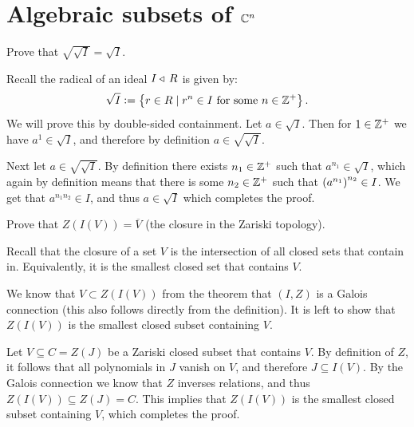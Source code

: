 \documentclass[11pt, a4paper]{article}
\begin{document}
\tableofcontents
\newpage

\section{Algebraic subsets of \texorpdfstring{$\mathbb{C}^n$}{C}}

\begin{exercise}
  Prove that $\sqrt{\sqrt{I}} = \sqrt{I}$.
\end{exercise}
\begin{solution}
  Recall the radical of an ideal $I \triangleleft\, R$
  is given by:
  \[
    \sqrt{I} :=
    \left\{r \in R \mid r^n \in I \text{ for some } n \in \mathbb{Z}^{+}\right\}.
  \]
  We will prove this by double-sided containment.
  Let $a \in \sqrt{I}$.
  Then for $1 \in \mathbb{Z}^+$ we have $a^1 \in \sqrt{I}$,
  and therefore by definition $a \in \sqrt{\sqrt{I}}$.

  Next let $a \in \sqrt{\sqrt{I}}$.
  By definition there exists $n_1 \in \mathbb{Z}^+$ such that $a^{n_1} \in \sqrt{I}$,
  which again by definition means that there is some $n_2 \in \mathbb{Z}^+$
  such that $\del{a^{n_1}}^{n_2} \in I$.
  We get that $a^{n_1 n_2} \in I$, and thus $a \in \sqrt{I}$
  which completes the proof.
\end{solution}

\begin{exercise}
  Prove that $Z(I(V)) = \overline V$ (the closure in the Zariski topology).
\end{exercise}
\begin{solution}
  Recall that the closure of a set $V$ is the intersection of all closed
  sets that contain in.
  Equivalently, it is the smallest closed set that contains $V$.

  We know that $V \subset Z(I(V))$ from the theorem that $(I,Z)$
  is a Galois connection (this also follows directly from the definition).
  It is left to show that $Z(I(V))$ is the smallest closed subset containing
  $V$.

  Let $V \subseteq C = Z(J)$ be a Zariski closed subset that contains $V$.
  By definition of $Z$, it follows that all polynomials in $J$
  vanish on $V$, and therefore $J \subseteq I(V)$.
  By the Galois connection we know that $Z$ inverses relations,
  and thus $Z(I(V)) \subseteq Z(J) = C$.
  This implies that $Z(I(V))$ is the smallest closed subset containing $V$,
  which completes the proof.
\end{solution}
\end{document}
